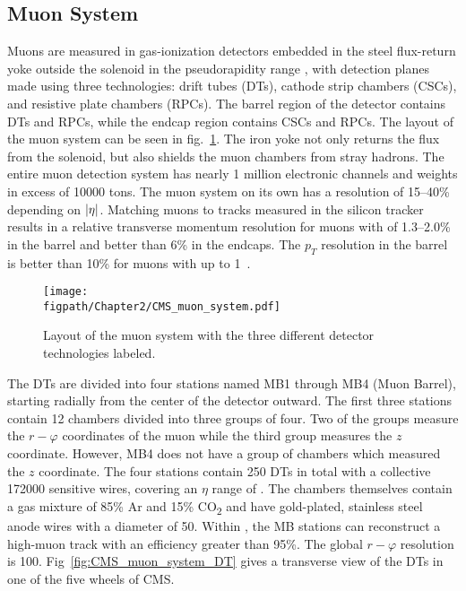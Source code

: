 \subsection{Muon System}

Muons are measured in gas-ionization detectors embedded in the steel flux-return yoke outside the solenoid in the pseudorapidity range , with detection planes made using three technologies: drift tubes (DTs), cathode strip chambers (CSCs), and resistive plate chambers (RPCs).
The barrel region of the detector contains DTs and RPCs, while the endcap region contains CSCs and RPCs.
The layout of the muon system can be seen in fig.~\ref{fig:CMS_muon_system}.
The iron yoke not only returns the flux from the solenoid, but also shields the muon chambers from stray hadrons.
The entire muon detection system has nearly 1 million electronic channels and weights in excess of 10000 tons.
The muon system on its own has a resolution of 15--40\% depending on $\lvert \eta \rvert$.
Matching muons to tracks measured in the silicon tracker results in a relative transverse momentum resolution for muons with \GeV of 1.3--2.0\% in the barrel and better than 6\% in the endcaps. The $p_{T}$ resolution in the barrel is better than 10\% for muons with \pt up to 1\TeV~\cite{Chatrchyan:2012xi}.

\begin{figure}[!hbt]
	\centering
	\texttt{[image: \\figpath/Chapter2/CMS\_muon\_system.pdf]}
	\caption{Layout of the muon system with the three different detector technologies labeled.}
	\label{fig:CMS_muon_system}
\end{figure}

The DTs are divided into four stations named MB1 through MB4 (Muon Barrel), starting radially from the center of the detector outward.
The first three stations contain 12 chambers divided into three groups of four.
Two of the groups measure the $r-\varphi$ coordinates of the muon while the third group measures the $z$ coordinate.
However, MB4 does not have a group of chambers which measured the $z$ coordinate.
The four stations contain 250 DTs in total with a collective 172000 sensitive wires, covering an $\eta$ range of .
The chambers themselves contain a gas mixture of 85\% Ar and 15\% CO\textsubscript{2} and have gold-plated, stainless steel anode wires with a diameter of 50\mum.
Within , the MB stations can reconstruct a high-\pt muon track with an efficiency greater than 95\%.
The global $r-\varphi$ resolution is 100\mum.
Fig~\ref{fig:CMS_muon_system_DT} gives a transverse view of the DTs in one of the five wheels of CMS.

